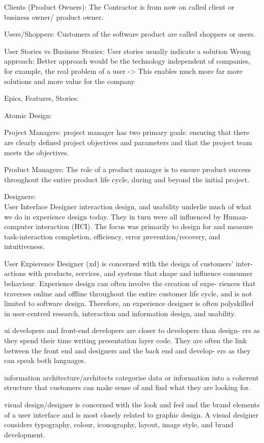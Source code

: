 Clients (Product Owners):
The Contractor is from now on called client or business owner/ product owner.

Users/Shoppers:
Customers of the software product are called shoppers or users.

User Stories vs Business Stories:
User stories usually indicate a solution
Wrong approach:
Better approach would be the technology independent of companies, for example, the real problem of a user -> This enables much more far more solutions and more value for the company

Epics, Features, Stories:

Atomic Design:

Project Managers:
project manager has two primary goals: ensuring that there are clearly defined project objectives and parameters and that the project team meets the objectives.

Product Managers:
The role of a product manager is to ensure product success throughout the entire product life cycle, during and beyond the initial project.

Designers:\\
User Interface Designer interaction design, and usability underlie much of what we do in experience design today. They in turn were all influenced by Human-computer interaction (HCI). The focus was primarily to design for and measure task-interaction completion, efficiency, error prevention/recovery, and intuitiveness.

User Expierence Designer (xd) is concerned with the design of customers’ inter- actions with products, services, and systems that shape and influence consumer behaviour. Experience design can often involve the creation of expe- riences that traverses online and offline throughout the entire customer life cycle, and is not limited to software design. Therefore, an experience designer is often polyskilled in user-centred research, interaction and information design, and usability.

ui developers and front-end developers are closer to developers than design- ers as they spend their time writing presentation layer code. They are often the link between the front end and designers and the back end and develop- ers as they can speak both languages.

information architecture/architects categorise data or information into a coherent structure that customers can make sense of and find what they are looking for.

visual design/designer is concerned with the look and feel and the brand elements of a user interface and is most closely related to graphic design. A visual designer considers typography, colour, iconography, layout, image style, and brand development.

